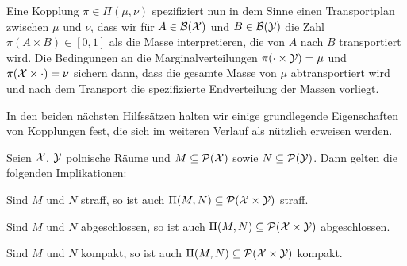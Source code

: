 \documentclass[../thesis/thesis.tex]{subfiles}
\begin{document}
	Eine Kopplung $\pi \in \Pi(\mu, \nu)$ spezifiziert nun in dem Sinne einen Transportplan zwischen $\mu$ und $\nu$, dass wir für $A \in \mathcal{B}(\mathcal{X})$ und $B \in \mathcal{B}(\mathcal{Y})$ die Zahl
	$\pi(A \times B) \in [0, 1]$ als die Masse interpretieren, die von $A$ nach $B$ transportiert wird. Die Bedingungen an die Marginalverteilungen $\pi(\cdot \times \mathcal{Y}) = \mu$ und $\pi(\mathcal{X} \times \cdot) = \nu$ sichern dann, dass die gesamte Masse von $\mu$ abtransportiert wird und nach dem Transport die spezifizierte Endverteilung der Massen vorliegt.
	
	
	
	In den beiden nächsten Hilfssätzen halten wir einige grundlegende Eigenschaften von Kopplungen fest, die sich im weiteren Verlauf als nützlich erweisen werden.

	\begin{Hilfssatz}
		\label{hilfssatz:eigenschaften_kopplungen}
		Seien $\mathcal{X}$, $\mathcal{Y}$ polnische Räume und $M \subseteq \mathcal{P}(\mathcal{X})$ sowie $N \subseteq \mathcal{P}(\mathcal{Y})$. Dann gelten die folgenden Implikationen:
		\begin{enumeratethm}
			\item Sind $M$ und $N$ straff, so ist auch $\Pi(M, N) \subseteq \mathcal{P}(\mathcal{X} \times \mathcal{Y})$ straff.
			\item Sind $M$ und $N$ abgeschlossen, so ist auch $\Pi(M, N) \subseteq \mathcal{P}(\mathcal{X} \times \mathcal{Y})$ abgeschlossen.
			\item Sind $M$ und $N$ kompakt, so ist auch $\Pi(M, N) \subseteq \mathcal{P}(\mathcal{X} \times \mathcal{Y})$ kompakt.
		\end{enumeratethm}
	\end{Hilfssatz}
\end{document}

